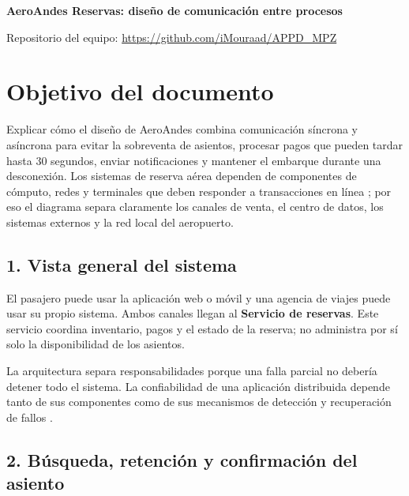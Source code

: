 \documentclass[11pt,a4paper]{article}
\begin{document}
\begin{center}
{\LARGE\textbf{AeroAndes Reservas: diseño de comunicación entre procesos}\par}
\end{center}

\begin{center}
\small Repositorio del equipo: \url{https://github.com/iMouraad/APPD_MPZ}
\end{center}

\section*{Objetivo del documento}

Explicar cómo el diseño de AeroAndes combina comunicación síncrona y asíncrona para evitar la sobreventa de asientos, procesar pagos que pueden tardar hasta 30 segundos, enviar notificaciones y mantener el embarque durante una desconexión. Los sistemas de reserva aérea dependen de componentes de cómputo, redes y terminales que deben responder a transacciones en línea \cite{airline-reservations}; por eso el diagrama separa claramente los canales de venta, el centro de datos, los sistemas externos y la red local del aeropuerto.

\subsection*{1. Vista general del sistema}

El pasajero puede usar la aplicación web o móvil y una agencia de viajes puede usar su propio sistema. Ambos canales llegan al \textbf{Servicio de reservas}. Este servicio coordina inventario, pagos y el estado de la reserva; no administra por sí solo la disponibilidad de los asientos.

La arquitectura separa responsabilidades porque una falla parcial no debería detener todo el sistema. La confiabilidad de una aplicación distribuida depende tanto de sus componentes como de sus mecanismos de detección y recuperación de fallos \cite{distributed-reliability}.

\subsection*{2. Búsqueda, retención y confirmación del asiento}
\end{document}
